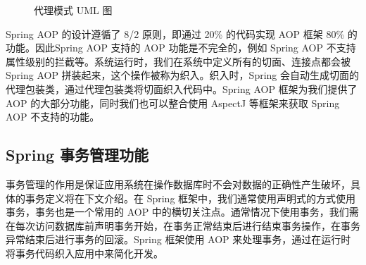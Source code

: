 \begin{figure}[!ht]
    \centering
    \caption{代理模式 UML 图}
    \label{fig:Proxy}
\end{figure}

Spring AOP 的设计遵循了 8/2 原则，即通过 20\% 的代码实现 AOP
 框架 80\% 的功能。因此Spring AOP 支持的 AOP 功能是不完全的，例如 Spring AOP 不支持属性级别的拦截等。系统运行时，我们在系统中定义所有的切面、连接点都会被 Spring AOP 拼装起来，这个操作被称为织入\cite{spring2019}。织入时，Spring 会自动生成切面的代理包装类，通过代理包装类将切面织入代码中。Spring AOP 框架为我们提供了 AOP 的大部分功能，同时我们也可以整合使用 AspectJ 等框架来获取 Spring AOP 不支持的功能。
 
 \subsection{Spring 事务管理功能}
 
 事务管理的作用是保证应用系统在操作数据库时不会对数据的正确性产生破坏，具体的事务定义将在下文介绍。在 Spring 框架中，我们通常使用声明式的方式使用事务，事务也是一个常用的 AOP 中的横切关注点。通常情况下使用事务，我们需在每次访问数据库前声明事务开始，在事务正常结束后进行结束事务操作，在事务异常结束后进行事务的回滚。Spring 框架使用 AOP 来处理事务，通过在运行时将事务代码织入应用中来简化开发\cite{spring2019,walls2005spring}。
 
